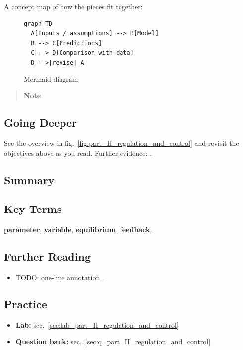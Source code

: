 \documentclass[
]{article}
\providecommand{\tightlist}{%
  \setlength{\itemsep}{0pt}\setlength{\parskip}{0pt}}
\theoremstyle{plain}
\theoremstyle{definition}
\begin{document}
A concept map of how the pieces fit together:

\begin{figure}[htbp]
\centering
\begin{verbatim}
graph TD
  A[Inputs / assumptions] --> B[Model]
  B --> C[Predictions]
  C --> D[Comparison with data]
  D -->|revise| A
\end{verbatim}
\caption{Mermaid diagram}
\end{figure}

\begin{quote}
\textbf{Note}
\end{quote}

\subsection{Going Deeper}\label{going-deeper-7}

See the overview in fig.~\ref{fig:part_II_regulation_and_control} and
revisit the objectives above as you read. Further evidence:
\citep{wilson2021analysis, taylor2019theory}.

\subsection{Summary}\label{summary-8}

\subsection{Key Terms}\label{key-terms-8}

\hyperref[gl:parameter]{\textbf{parameter}},
\hyperref[gl:variable]{\textbf{variable}},
\hyperref[gl:equilibrium]{\textbf{equilibrium}},
\hyperref[gl:feedback]{\textbf{feedback}}.

\subsection{Further Reading}\label{further-reading-8}

\begin{itemize}
\item
  TODO: one-line annotation \citep{smith2020foundations}.
\end{itemize}

\subsection{Practice}\label{practice-8}

\begin{itemize}
\tightlist
\item
  \textbf{Lab:} sec.~\ref{sec:lab_part_II_regulation_and_control}
\item
  \textbf{Question bank:}
  sec.~\ref{sec:q_part_II_regulation_and_control}
\end{itemize}
\end{document}
